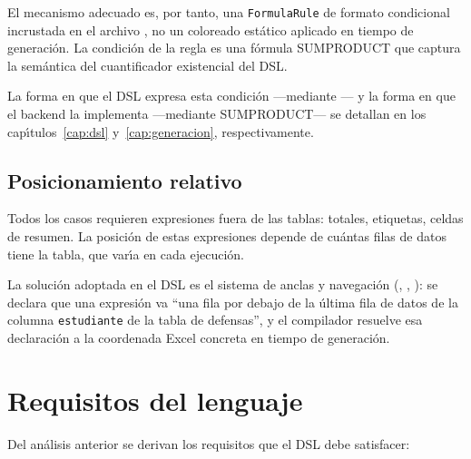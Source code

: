 El mecanismo adecuado es, por tanto, una \texttt{FormulaRule} de formato
condicional incrustada en el archivo \xlsx{}, no un coloreado est\'atico
aplicado en tiempo de generaci\'on.  La condici\'on de la regla es una
f\'ormula SUMPRODUCT que captura la sem\'antica del cuantificador existencial
del DSL.

La forma en que el DSL expresa esta condici\'on ---mediante ---
y la forma en que el backend la implementa ---mediante SUMPRODUCT--- se
detallan en los cap\'{\i}tulos~\ref{cap:dsl} y~\ref{cap:generacion},
respectivamente.

\subsection{Posicionamiento relativo}
\label{ssec:elem-posicion}

Todos los casos requieren expresiones fuera de las tablas: totales, etiquetas,
celdas de resumen.  La posici\'on de estas expresiones depende de cu\'antas
filas de datos tiene la tabla, que var\'{\i}a en cada ejecuci\'on.

La soluci\'on adoptada en el DSL es el sistema de anclas y navegaci\'on
(, , ): se declara que una
expresi\'on va ``una fila por debajo de la \'ultima fila de datos de la
columna \texttt{estudiante} de la tabla de defensas'', y el compilador
resuelve esa declaraci\'on a la coordenada Excel concreta en tiempo de
generaci\'on.

\section{Requisitos del lenguaje}
\label{sec:requisitos}

Del an\'alisis anterior se derivan los requisitos que el DSL debe satisfacer:

